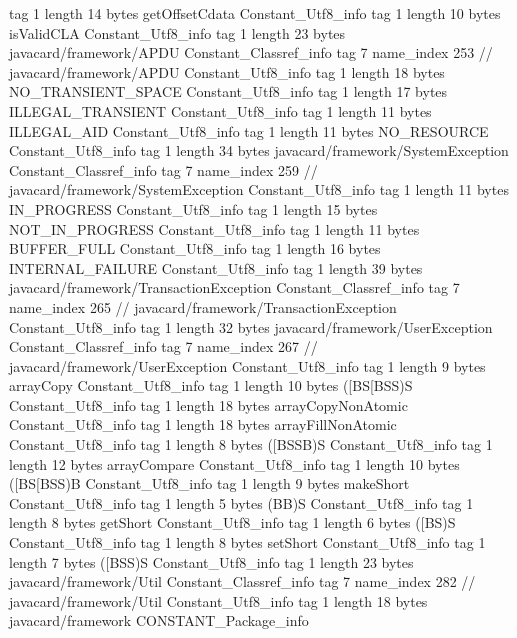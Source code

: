 {{{			tag	1
			length	14
			bytes	getOffsetCdata
		}
		Constant_Utf8_info {
			tag	1
			length	10
			bytes	isValidCLA
		}
		Constant_Utf8_info {
			tag	1
			length	23
			bytes	javacard/framework/APDU
		}
		Constant_Classref_info {
			tag	7
			name_index	253		// javacard/framework/APDU
		}
		Constant_Utf8_info {
			tag	1
			length	18
			bytes	NO_TRANSIENT_SPACE
		}
		Constant_Utf8_info {
			tag	1
			length	17
			bytes	ILLEGAL_TRANSIENT
		}
		Constant_Utf8_info {
			tag	1
			length	11
			bytes	ILLEGAL_AID
		}
		Constant_Utf8_info {
			tag	1
			length	11
			bytes	NO_RESOURCE
		}
		Constant_Utf8_info {
			tag	1
			length	34
			bytes	javacard/framework/SystemException
		}
		Constant_Classref_info {
			tag	7
			name_index	259		// javacard/framework/SystemException
		}
		Constant_Utf8_info {
			tag	1
			length	11
			bytes	IN_PROGRESS
		}
		Constant_Utf8_info {
			tag	1
			length	15
			bytes	NOT_IN_PROGRESS
		}
		Constant_Utf8_info {
			tag	1
			length	11
			bytes	BUFFER_FULL
		}
		Constant_Utf8_info {
			tag	1
			length	16
			bytes	INTERNAL_FAILURE
		}
		Constant_Utf8_info {
			tag	1
			length	39
			bytes	javacard/framework/TransactionException
		}
		Constant_Classref_info {
			tag	7
			name_index	265		// javacard/framework/TransactionException
		}
		Constant_Utf8_info {
			tag	1
			length	32
			bytes	javacard/framework/UserException
		}
		Constant_Classref_info {
			tag	7
			name_index	267		// javacard/framework/UserException
		}
		Constant_Utf8_info {
			tag	1
			length	9
			bytes	arrayCopy
		}
		Constant_Utf8_info {
			tag	1
			length	10
			bytes	([BS[BSS)S
		}
		Constant_Utf8_info {
			tag	1
			length	18
			bytes	arrayCopyNonAtomic
		}
		Constant_Utf8_info {
			tag	1
			length	18
			bytes	arrayFillNonAtomic
		}
		Constant_Utf8_info {
			tag	1
			length	8
			bytes	([BSSB)S
		}
		Constant_Utf8_info {
			tag	1
			length	12
			bytes	arrayCompare
		}
		Constant_Utf8_info {
			tag	1
			length	10
			bytes	([BS[BSS)B
		}
		Constant_Utf8_info {
			tag	1
			length	9
			bytes	makeShort
		}
		Constant_Utf8_info {
			tag	1
			length	5
			bytes	(BB)S
		}
		Constant_Utf8_info {
			tag	1
			length	8
			bytes	getShort
		}
		Constant_Utf8_info {
			tag	1
			length	6
			bytes	([BS)S
		}
		Constant_Utf8_info {
			tag	1
			length	8
			bytes	setShort
		}
		Constant_Utf8_info {
			tag	1
			length	7
			bytes	([BSS)S
		}
		Constant_Utf8_info {
			tag	1
			length	23
			bytes	javacard/framework/Util
		}
		Constant_Classref_info {
			tag	7
			name_index	282		// javacard/framework/Util
		}
		Constant_Utf8_info {
			tag	1
			length	18
			bytes	javacard/framework
		}
		CONSTANT_Package_info {
}}}
